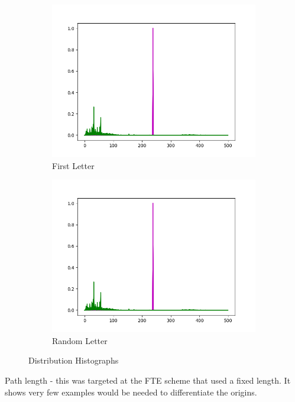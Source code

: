 \documentclass[10pt,a4paper]{article}
\begin{document}
\begin{figure}[h]
\begin{subfigure}[b]{0.24\textwidth}
		\includegraphics[width=\textwidth]{bob}
		\caption{First Letter}
		\label{fig:first_hist}
	\end{subfigure}
	\begin{subfigure}[b]{0.24\textwidth}
		\includegraphics[width=\textwidth]{bob}
		\caption{Random Letter}
		\label{fig:rand_hist}
	\end{subfigure}

	\caption{Distribution Histographs}\label{fig:hists}
\end{figure}

Path length - this was targeted at the FTE scheme that used a fixed length. It shows very few examples would be needed to differentiate the origins.
\end{document}
